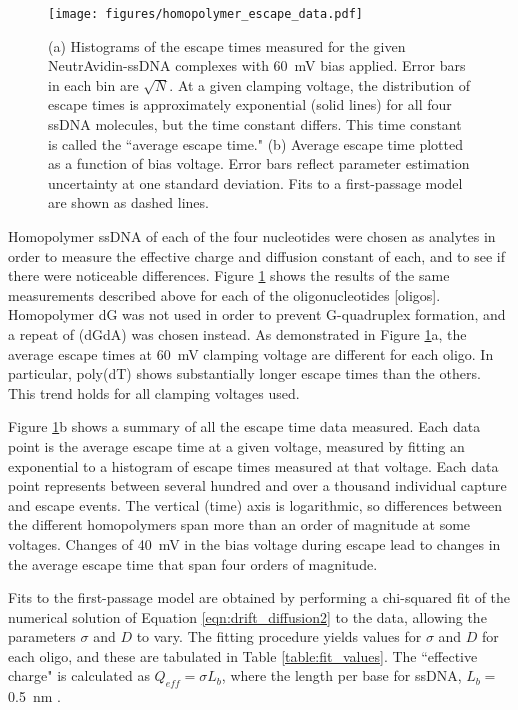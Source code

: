 \begin{figure}[h]
\begin{centering}
\texttt{[image: figures/homopolymer\_escape\_data.pdf]}
\caption[Measured escape times of homopolymer ssDNA from MspA]{(a) Histograms of the escape times measured for the given NeutrAvidin-ssDNA complexes with \SI{60}{\mV} bias applied.  Error bars in each bin are $\sqrt{N}$.  At a given clamping voltage, the distribution of escape times is approximately exponential (solid lines) for all four ssDNA molecules, but the time constant differs.  This time constant is called the ``average escape time."  (b) Average escape time plotted as a function of bias voltage.  Error bars reflect parameter estimation uncertainty at one standard deviation.  Fits to a first-passage model are shown as dashed lines.}
\label{fig:escape_times}
\end{centering}
\end{figure}

Homopolymer ssDNA of each of the four nucleotides were chosen as analytes in order to measure the effective charge and diffusion constant of each, and to see if there were noticeable differences.  Figure \ref{fig:escape_times} shows the results of the same measurements described above for each of the oligonucleotides [oligos].  Homopolymer dG was not used in order to prevent G-quadruplex formation, and a repeat of (dGdA) was chosen instead.  As demonstrated in Figure \ref{fig:escape_times}a, the average escape times at \SI{60}{\mV} clamping voltage are different for each oligo.  In particular, poly(dT) shows substantially longer escape times than the others.  This trend holds for all clamping voltages used.

Figure \ref{fig:escape_times}b shows a summary of all the escape time data measured.  Each data point is the average escape time at a given voltage, measured by fitting an exponential to a histogram of escape times measured at that voltage.  Each data point represents between several hundred and over a thousand individual capture and escape events.  The vertical (time) axis is logarithmic, so differences between the different homopolymers 
span more than an order of magnitude at some voltages.  Changes of \SI{40}{\mV} in the bias voltage during escape lead to changes in the average escape time that span four orders of magnitude.

Fits to the first-passage model are obtained by performing a chi-squared fit of the numerical solution of Equation \ref{eqn:drift_diffusion2} to the data, allowing the parameters $\sigma$ and $D$ to vary.  The fitting procedure yields values for $\sigma$ and $D$ for each oligo, and these are tabulated in Table \ref{table:fit_values}.  The ``effective charge" is calculated as $Q_{eff} = \sigma L_b$, where the length per base for ssDNA, $L_b = $ \SI{0.5}{\nm} \citep{Smith1996,Chi2013}.

